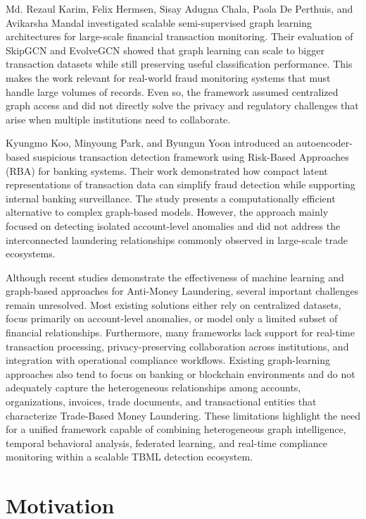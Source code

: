 Md. Rezaul Karim, Felix Hermsen, Sisay Adugna Chala, Paola De Perthuis, and Avikarsha Mandal \cite{Karim2024} investigated scalable semi-supervised graph learning architectures for large-scale financial transaction monitoring. Their evaluation of SkipGCN and EvolveGCN showed that graph learning can scale to bigger transaction datasets while still preserving useful classification performance. This makes the work relevant for real-world fraud monitoring systems that must handle large volumes of records. Even so, the framework assumed centralized graph access and did not directly solve the privacy and regulatory challenges that arise when multiple institutions need to collaborate.

Kyungmo Koo, Minyoung Park, and Byungun Yoon \cite{Koo2024} introduced an autoencoder-based suspicious transaction detection framework using Risk-Based Approaches (RBA) for banking systems. Their work demonstrated how compact latent representations of transaction data can simplify fraud detection while supporting internal banking surveillance. The study presents a computationally efficient alternative to complex graph-based models. However, the approach mainly focused on detecting isolated account-level anomalies and did not address the interconnected laundering relationships commonly observed in large-scale trade ecosystems.

Although recent studies demonstrate the effectiveness of machine learning and graph-based approaches for Anti-Money Laundering, several important challenges remain unresolved. Most existing solutions either rely on centralized datasets, focus primarily on account-level anomalies, or model only a limited subset of financial relationships. Furthermore, many frameworks lack support for real-time transaction processing, privacy-preserving collaboration across institutions, and integration with operational compliance workflows. Existing graph-learning approaches also tend to focus on banking or blockchain environments and do not adequately capture the heterogeneous relationships among accounts, organizations, invoices, trade documents, and transactional entities that characterize Trade-Based Money Laundering. These limitations highlight the need for a unified framework capable of combining heterogeneous graph intelligence, temporal behavioral analysis, federated learning, and real-time compliance monitoring within a scalable TBML detection ecosystem.


\section[Motivation]{\textbf{Motivation}}

